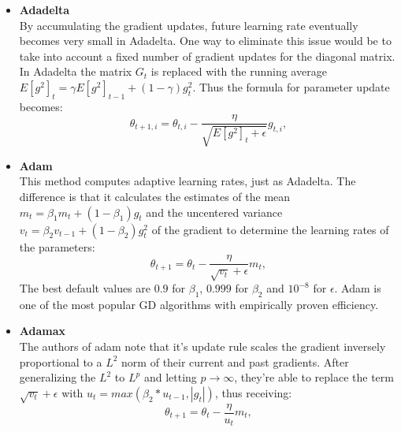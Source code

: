 \begin{itemize}
  \item \textbf{Adadelta} \autocite{zeiler2012adadeltaadaptivelearningrate} \\
    By accumulating the gradient updates, future learning rate eventually becomes very small in Adadelta. One way to eliminate this issue would be to take into account a fixed number of gradient updates for the diagonal matrix. In Adadelta the matrix $ G_t $ is replaced with the running average $E[g^2]_t = \gamma E[g^2]_{t-1} + (1 - \gamma)g_t^2$. Thus the formula for parameter update becomes:
    \[ \theta_{t+1, i} = \theta_{t, i} - \frac{\eta}{\sqrt{E[g^2]_t + \epsilon}} g_{t,i}, \]
  \item \textbf{Adam} \autocite{kingma2015adam} \\
    This method computes adaptive learning rates, just as Adadelta. The difference is that it calculates the estimates of the mean $ m_t = \beta_1 m_t + (1 - \beta_1)g_t $ and the uncentered variance $ v_t = \beta_2 v_{t-1} + (1 - \beta_2)g_t^2 $ of the gradient to determine the learning rates of the parameters:
    \[ \theta_{t+1} = \theta_t - \frac{\eta}{\sqrt{v_t} + \epsilon} m_t, \]
    The best default values are $0.9$ for $\beta_1$, $0.999$ for $\beta_2$ and $10^{-8}$ for $\epsilon$. Adam is one of the most popular GD algorithms with empirically proven efficiency.
  \item \textbf{Adamax} \autocite{kingma2015adam} \\
    The authors of adam note that it's update rule scales the gradient inversely proportional to a $L^2$ norm of their current and past gradients. After generalizing the $L^2$ to $L^p$ and letting $p \rightarrow \infty$, they're able to replace the term $\sqrt{v_t} + \epsilon$ with $u_t = max(\beta_2 * u_{t - 1}, |g_t|)$, thus receiving:
    \[ \theta_{t+1} = \theta_t - \frac{\eta}{u_t} m_t, \]
\end{itemize}
